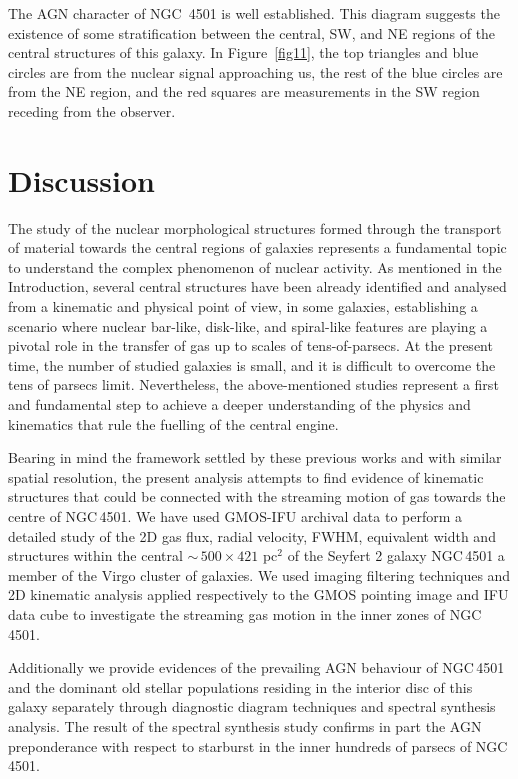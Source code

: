 \documentclass[fleqn,usenatbib]{mnras}
\begin{document}
The AGN character of NGC\, 4501 is well established. This diagram suggests the existence of some stratification between the central, SW, and NE regions of the central structures of 
this galaxy. In Figure~\ref{fig11}, the top triangles and blue circles are from the nuclear signal approaching us, the rest of the blue circles are from the NE region, 
and the red squares are measurements in the SW region receding from the observer.

\section{Discussion}\label{sec:s9}

The study of the nuclear morphological structures formed through
the transport of material towards the central regions of galaxies represents 
a fundamental topic to understand the complex phenomenon of nuclear activity.
As mentioned in the Introduction, several central structures have been already
identified and analysed from a kinematic and physical point of view, in some 
galaxies, establishing a scenario where nuclear bar-like, disk-like, and 
spiral-like features are playing a pivotal role in the transfer of gas up 
to scales of tens-of-parsecs. At the present time, the number of studied galaxies is 
small, and it is difficult to overcome the tens of parsecs limit. Nevertheless, the 
above-mentioned studies represent a first and fundamental step to achieve a deeper 
understanding of the physics and kinematics that rule the fuelling of the central engine. 

Bearing in mind the framework settled by these previous works 
and with similar spatial resolution, the present analysis attempts to find evidence 
of kinematic structures that could be connected with the streaming motion of 
gas towards the centre of NGC\,4501. We have used GMOS-IFU archival data to perform a detailed study of
the 2D gas flux, radial velocity, FWHM, equivalent width and structures within the 
central $\sim\, 500 \times 421$ pc$^2$ of the Seyfert 2 galaxy NGC\,4501 a member of the 
Virgo cluster of galaxies. We used imaging filtering techniques and 2D kinematic analysis
applied respectively to the GMOS pointing image and IFU data cube to investigate the streaming 
gas motion in the inner zones of NGC\,4501. 

Additionally we provide evidences of the prevailing AGN behaviour of NGC\,4501 and the dominant old stellar
populations residing in the interior disc of this galaxy separately through diagnostic diagram techniques 
and spectral synthesis analysis. The result of the spectral synthesis study confirms in part the AGN 
preponderance with respect to starburst in the inner hundreds of parsecs of NGC\,4501.
\end{document}
